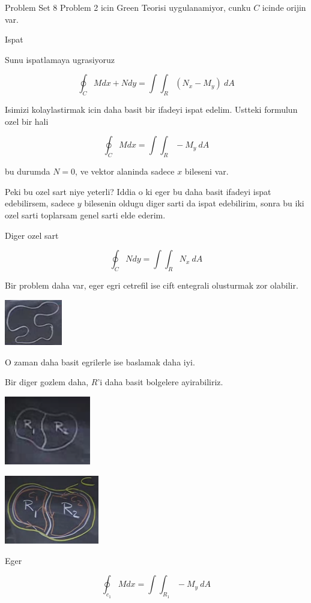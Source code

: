 \documentclass[12pt,fleqn]{article}
\begin{document}
Problem Set 8 Problem 2 icin Green Teorisi uygulanamiyor, cunku $C$
icinde orijin var. 

Ispat

Sunu ispatlamaya ugrasiyoruz

\[ \oint_C M dx + N dy = \int \int_R (N_x - M_y) \ dA \]

Isimizi kolaylastirmak icin daha basit bir ifadeyi ispat edelim. Ustteki
formulun ozel bir hali

\[ \oint_C M dx  = \int \int_R -M_y \ dA \]

bu durumda $N=0$, ve vektor alaninda sadece $x$ bileseni var. 

Peki bu ozel sart niye yeterli? Iddia o ki eger bu daha basit ifadeyi ispat
edebilirsem, sadece $y$ bilesenin oldugu diger sarti da ispat edebilirim,
sonra bu iki ozel sarti toplarsam genel sarti elde ederim. 

Diger ozel sart

\[ \oint_C N dy  = \int \int_R N_x \ dA \]

Bir problem daha var, eger egri cetrefil ise cift entegrali olusturmak zor
olabilir. 

\includegraphics[height=2cm]{22_3.png}

O zaman daha basit egrilerle ise baslamak daha iyi. 

Bir diger gozlem daha, $R$'i daha basit bolgelere ayirabiliriz. 

\includegraphics[height=3cm]{22_4.png}

\includegraphics[height=3cm]{22_5.png}

Eger 

\[ \oint_{c_1} M dx  = \int \int_{R_1} -M_y \ dA \]
\end{document}
